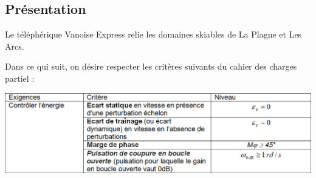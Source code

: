 \documentclass[10pt,fleqn]{article} %
\begin{document}

\vspace{5cm}
\pagestyle{fancy}
\thispagestyle{plain}

\def\columnseprulecolor{\color{ocre}}
\setlength{\columnseprule}{0.4pt} 

\def\pathfig{images}

\begin{multicols}{2}

\subsection*{Présentation}


Le téléphérique Vanoise Express relie les domaines skiables de La Plagne et Les Arcs.%

	



Dans ce qui suit, on désire respecter les critères suivants du cahier des charges partiel :
\begin{center}
	\includegraphics[width=\linewidth]{images2/fig_01}
\end{center}


\end{multicols}
\end{document}
